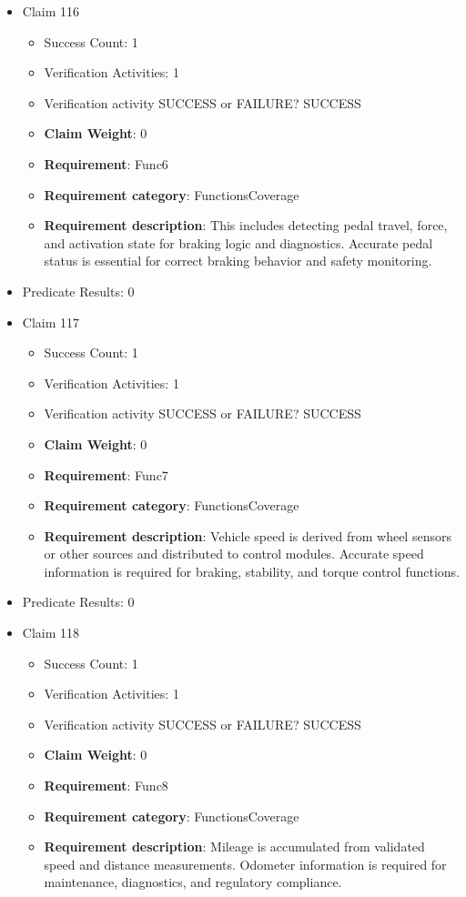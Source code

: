 \documentclass{article}
\begin{document}
\begin{itemize}
  				  \item Claim 116
				\begin{itemize}
			    	\item Success Count: 1 
			    	\item Verification Activities: 1
					\item Verification activity SUCCESS or FAILURE? SUCCESS
					\item \textbf{Claim Weight}: 0
						\item \textbf{Requirement}: Func6 
						\item \textbf{Requirement category}: FunctionsCoverage 
						\item \textbf{Requirement description}: This includes detecting pedal travel, force, and activation state for braking logic and diagnostics. Accurate pedal status is essential for correct braking behavior and safety monitoring.
					
				\end{itemize}
				
									    
				\item Predicate Results: 0

  				  \item Claim 117
				\begin{itemize}
			    	\item Success Count: 1 
			    	\item Verification Activities: 1
					\item Verification activity SUCCESS or FAILURE? SUCCESS
					\item \textbf{Claim Weight}: 0
						\item \textbf{Requirement}: Func7 
						\item \textbf{Requirement category}: FunctionsCoverage 
						\item \textbf{Requirement description}: Vehicle speed is derived from wheel sensors or other sources and distributed to control modules. Accurate speed information is required for braking, stability, and torque control functions.
					
				\end{itemize}
				
									    
				\item Predicate Results: 0

  				  \item Claim 118
				\begin{itemize}
			    	\item Success Count: 1 
			    	\item Verification Activities: 1
					\item Verification activity SUCCESS or FAILURE? SUCCESS
					\item \textbf{Claim Weight}: 0
						\item \textbf{Requirement}: Func8 
						\item \textbf{Requirement category}: FunctionsCoverage 
						\item \textbf{Requirement description}: Mileage is accumulated from validated speed and distance measurements. Odometer information is required for maintenance, diagnostics, and regulatory compliance.
					

\end{itemize}
\end{itemize}
\end{document}

